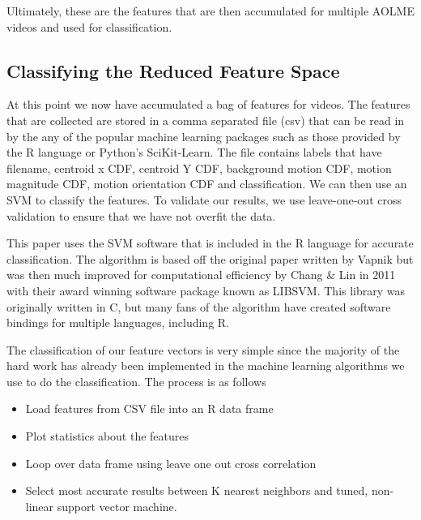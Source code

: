 Ultimately, these are the features that are then accumulated for multiple AOLME
videos and used for classification.

\subsection{\label{subsection:classification}Classifying the Reduced Feature Space}
At this point we now have accumulated a bag of features for videos. The features
that are collected are stored in a comma separated file (csv) that can be read
in by the any of the popular machine learning packages such as those provided
by the R language or Python's SciKit-Learn. The file contains labels that have
filename, centroid x CDF, centroid Y CDF, background motion CDF, motion magnitude
CDF, motion orientation CDF and classification. We can then use an SVM to classify
the features. To validate our results, we use leave-one-out cross validation
to ensure that we have not overfit the data.

This paper uses the SVM software that is included in the R language for
accurate classification. The algorithm is based off the original paper written
by Vapnik \cite{cortes1995support} but was then much improved for computational
efficiency by Chang \& Lin in 2011 \cite{chang2011libsvm} with their award
winning software package known as LIBSVM. This library was originally written
in C, but many fans of the algorithm have created software bindings for multiple
languages, including R.

The classification of our feature vectors is very simple since the majority of
the hard work has already been implemented in the machine learning algorithms
we use to do the classification. The process is as follows


\begin{itemize}
  \item Load features from CSV file into an R data frame
  \item Plot statistics about the features
  \item Loop over data frame using leave one out cross correlation
  \item Select most accurate results between K nearest neighbors and tuned, non-linear
  support vector machine.
\end{itemize}
